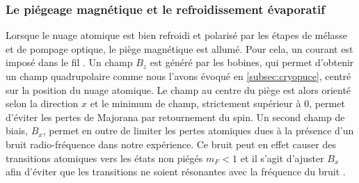	\subsubsection*{Le piégeage magnétique et le refroidissement évaporatif}
\noindent Lorsque le nuage atomique est bien refroidi et polarisé par les étapes de mélasse et de pompage optique, le piège magnétique est allumé.
Pour cela, un courant est imposé dans le fil .
Un champ $B_z$ est généré par les bobines, qui permet d'obtenir un champ quadrupolaire comme nous l'avons évoqué en \ref{subsec:cryopuce}, centré sur la position du nuage atomique.
Le champ au centre du piège est alors orienté selon la direction $x$ et le minimum de champ, strictement supérieur à $0$, permet d'éviter les pertes de Majorana par retournement du spin.
Un second champ de biais, $B_x$, permet en outre de limiter les pertes atomiques dues à la présence d'un bruit radio-fréquence dans notre expérience.
Ce bruit peut en effet causer des transitions atomiques vers les états non piégés $m_F<1$ et il s'agit d'ajuster $B_x$ afin d'éviter que les transitions ne soient résonantes avec la fréquence du bruit \cite{PHD_NIRRENGARTEN}.

